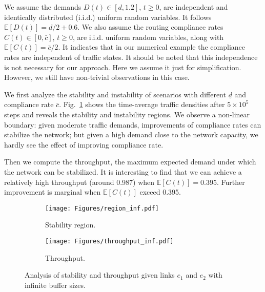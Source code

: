 We assume the demands $D(t)\in[\underline{d}, 1.2]$, $t\geq0$, are independent and identically distributed (i.i.d.) uniform random variables. It follows $\mathbb{E}[D(t)]=\underline{d}/2+0.6$.  We also assume the routing compliance rates $C(t)\in[0,\bar{c}]$, $t\geq0$, are i.i.d. uniform random variables, along with $\mathbb{E}[C(t)]=\bar{c}/2$. It indicates that in our numerical example the compliance rates are independent of traffic states. It should be noted that this independence is not necessary for our approach. Here we assume it just for simplification. However, we still have non-trivial observations in this case.

We first analyze the stability and instability of scenarios with different $\underline d$ and compliance rate $\bar c$. Fig.~\ref{fig_region_inf} shows the time-average traffic densities after $5\times10^5$ steps and reveals the stability and instability regions. We observe a non-linear boundary: given moderate traffic demands, improvements of compliance rates can stabilize the network; but given a high demand close to the network capacity, we hardly see the effect of improving compliance rate.

Then we compute the throughput, the maximum expected demand under which the network can be stabilized. It is interesting to find that we can achieve a relatively high throughput (around 0.987) when $\mathbb{E}[C(t)]=0.395$. Further improvement is marginal when $\mathbb{E}[C(t)]$ exceed 0.395.  
\begin{figure}[htbp]
    \centering
    \begin{subfigure}{0.45\linewidth}
    \centering
    \texttt{[image: Figures/region\_inf.pdf]}  
  \caption{Stability region.}
  \label{fig_region_inf}
\end{subfigure}
\begin{subfigure}{0.45\linewidth}
  \centering
  \texttt{[image: Figures/throughput\_inf.pdf]}  
  \caption{Throughput.}
  \label{fig_throu_inf}
\end{subfigure}
    \caption{Analysis of stability and throughput given links $e_1$ and $e_2$ with infinite buffer sizes.}
    \label{fig_infinite_analysis}
\end{figure}


